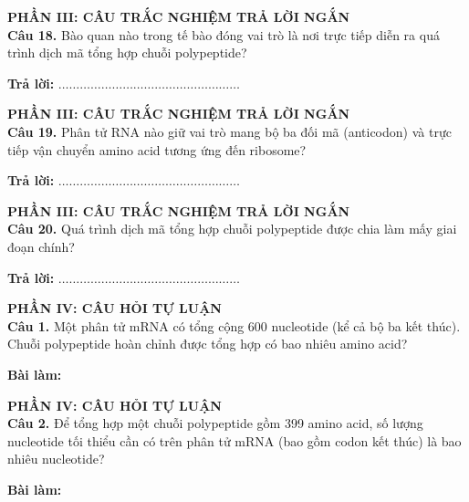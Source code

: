 \documentclass{article}
\begin{document}
\begin{minipage}[t][14.4cm][t]{\linewidth}
\fontsize{28}{38}\selectfont
{\color{brandGreen}\textbf{PHẦN III: CÂU TRẮC NGHIỆM TRẢ LỜI NGẮN}\\[10pt]}
\textbf{Câu 18.} Bào quan nào trong tế bào đóng vai trò là nơi trực tiếp diễn ra quá trình dịch mã tổng hợp chuỗi polypeptide?
\vspace{20pt}

\textbf{Trả lời:} $\dots\dots\dots\dots\dots\dots\dots\dots\dots\dots\dots\dots\dots\dots\dots\dots\dots$
\vfill
\end{minipage}
\newpage


\begin{minipage}[t][14.4cm][t]{\linewidth}
\fontsize{28}{38}\selectfont
{\color{brandGreen}\textbf{PHẦN III: CÂU TRẮC NGHIỆM TRẢ LỜI NGẮN}\\[10pt]}
\textbf{Câu 19.} Phân tử RNA nào giữ vai trò mang bộ ba đối mã (anticodon) và trực tiếp vận chuyển amino acid tương ứng đến ribosome?
\vspace{20pt}

\textbf{Trả lời:} $\dots\dots\dots\dots\dots\dots\dots\dots\dots\dots\dots\dots\dots\dots\dots\dots\dots$
\vfill
\end{minipage}
\newpage


\begin{minipage}[t][14.4cm][t]{\linewidth}
\fontsize{28}{38}\selectfont
{\color{brandGreen}\textbf{PHẦN III: CÂU TRẮC NGHIỆM TRẢ LỜI NGẮN}\\[10pt]}
\textbf{Câu 20.} Quá trình dịch mã tổng hợp chuỗi polypeptide được chia làm mấy giai đoạn chính?
\vspace{20pt}

\textbf{Trả lời:} $\dots\dots\dots\dots\dots\dots\dots\dots\dots\dots\dots\dots\dots\dots\dots\dots\dots$
\vfill
\end{minipage}
\newpage


\begin{minipage}[t][14.4cm][t]{\linewidth}
\fontsize{26}{35}\selectfont
{\color{brandGreen}\textbf{PHẦN IV: CÂU HỎI TỰ LUẬN}\\[10pt]}
\textbf{Câu 1.} Một phân tử mRNA có tổng cộng 600 nucleotide (kể cả bộ ba kết thúc). Chuỗi polypeptide hoàn chỉnh được tổng hợp có bao nhiêu amino acid?
\vspace{14pt}

\textbf{Bài làm:}
\vfill
\end{minipage}
\newpage


\begin{minipage}[t][14.4cm][t]{\linewidth}
\fontsize{26}{35}\selectfont
{\color{brandGreen}\textbf{PHẦN IV: CÂU HỎI TỰ LUẬN}\\[10pt]}
\textbf{Câu 2.} Để tổng hợp một chuỗi polypeptide gồm 399 amino acid, số lượng nucleotide tối thiểu cần có trên phân tử mRNA (bao gồm codon kết thúc) là bao nhiêu nucleotide?
\vspace{14pt}

\textbf{Bài làm:}
\vfill
\end{minipage}
\newpage
\end{document}
